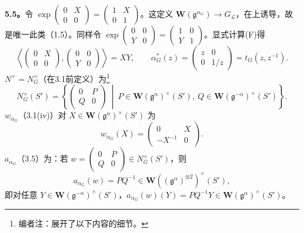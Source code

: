 \textbf{5.5。}令 $\exp\left(\begin{smallmatrix}0&X\\0&0\end{smallmatrix}\right)=\left(\begin{smallmatrix}1&X\\0&1\end{smallmatrix}\right)$。这定义 $\mathbf W(\mathfrak g^{\alpha_G})\to G_{\mathscr L}$，在上诱导，故是唯一此类（1.5）。同样令 $\exp\left(\begin{smallmatrix}0&0\\Y&0\end{smallmatrix}\right)=\left(\begin{smallmatrix}1&0\\Y&1\end{smallmatrix}\right)$。显式计算(F)得
\[\left\langle\begin{pmatrix}0&X\\0&0\end{pmatrix},\begin{pmatrix}0&0\\Y&0\end{pmatrix}\right\rangle=XY,\qquad\alpha_G^*(z)=\begin{pmatrix}z&0\\0&1/z\end{pmatrix}=t_G(z,z^{-1}).\]
 $N^\times=N_G^\times$（在3.1前定义）为\footnote{编者注：展开了以下内容的细节。}
\[N_G^\times(S')=\left\{\begin{pmatrix}0&P\\Q&0\end{pmatrix}\ \middle|\ P\in\mathbf W(\mathfrak g^\alpha)^\times(S'),\ Q\in\mathbf W(\mathfrak g^{-\alpha})^\times(S')\right\}.\]
 $w_{\alpha_G}$（3.1(iv)）对 $X\in\mathbf W(\mathfrak g^\alpha)^\times(S')$ 为
\[w_{\alpha_G}(X)=\begin{pmatrix}0&X\\-X^{-1}&0\end{pmatrix}.\]
 $a_{\alpha_G}$（3.5）为：若 $w=\left(\begin{smallmatrix}0&P\\Q&0\end{smallmatrix}\right)\in N_G^\times(S')$，则
\[a_{\alpha_G}(w)=PQ^{-1}\in\mathbf W((\mathfrak g^\alpha)^{\otimes2})^\times(S'),\]
即对任意 $Y\in\mathbf W(\mathfrak g^{-\alpha})^\times(S')$，$a_{\alpha_G}(w)(Y)=PQ^{-1}Y\in\mathbf W(\mathfrak g^\alpha)^\times(S')$。

